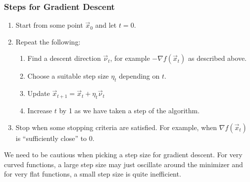 \documentclass[../main.tex]{subfiles}
\begin{document}
\subsubsection{Steps for Gradient Descent} \label{gradientAlgorithm}
\begin{enumerate}
  \item Start from some point $\vec{x}_0$ and let $t = 0$.
  \item Repeat the following:
    \begin{enumerate}
      \item Find a descent direction $\vec{\nu}_t$, for example $-\nabla f(\vec{x}_t)$ as described above.
      \item Choose a suitable step size $\eta_t$ depending on $t$.
      \item Update $\vec{x}_{t + 1} = \vec{x}_t + \eta_t \vec{\nu}_t$
      \item Increase $t$ by 1 as we have taken a step of the algorithm.
    \end{enumerate}
  \item Stop when some stopping criteria are satisfied.
    For example, when $\nabla f(\vec{x}_t)$ is ``sufficiently close'' to $0$.
\end{enumerate}
We need to be cautious when picking a step size for gradient descent.
For very curved functions, a large step size may just oscillate around the minimizer and for very flat functions, a small step size is quite inefficient.
\end{document}
